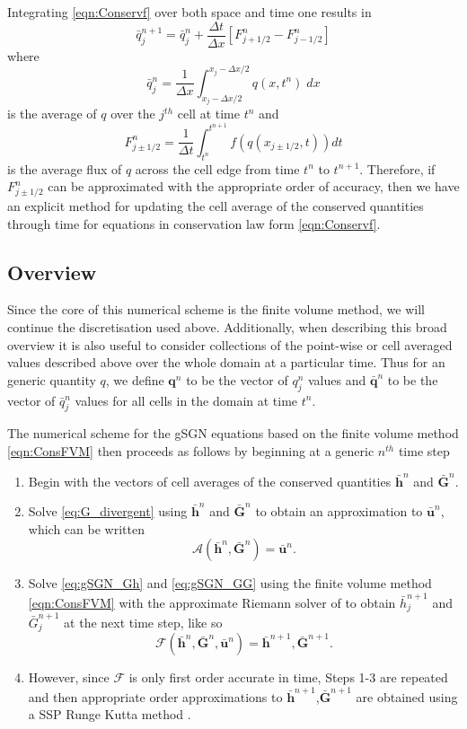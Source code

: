 \documentclass[10pt]{elsarticle}
\newcommand{\vecn}[1]{\boldsymbol{#1}}
\begin{document}
Integrating \eqref{eqn:Conservf} over both space and time one results in
\begin{equation}
\bar{q}^{n+1}_j = \bar{q}^{n}_j  +  \dfrac{\Delta t}{\Delta x}\left[F^n_{j+1/2} - F^n_{j-1/2}\right]
\label{eqn:ConsFVM}
\end{equation}
where 
\begin{equation*}
\bar{q}^n_j = \frac{1}{\Delta x} \int_{x_j - \Delta x / 2}^{x_j - \Delta x / 2} q(x,t^n) \; dx
\end{equation*}
is the average of $q$ over the $j^{th}$ cell at time $t^n$ and   
\begin{equation*}
F^n_{j\pm 1/2} =\frac{1}{\Delta t} \int_{t^n}^{t^{n+1}} f(q(x_{j\pm 1/2},t)) dt
\end{equation*}
is the average flux of $q$ across the cell edge from time $t^n$ to $t^{n+1}$. Therefore, if $F^n_{j\pm 1/2}$ can be approximated with the appropriate order of accuracy, then we have an explicit method for updating the cell average of the conserved quantities through time for equations in conservation law form \eqref{eqn:Conservf}. 


\subsection{Overview}
Since the core of this numerical scheme is the finite volume method, we will continue the discretisation used above. Additionally, when describing this broad overview it is also useful to consider collections of the point-wise or cell averaged values described above over the whole domain at a particular time. Thus for an generic quantity $q$, we define $\vecn{q}^n$ to be the vector of $q^n_j$ values and $\bar{\vecn{q}}^n$ to be the vector of $\bar{q}^n_j$ values for all cells in the domain at time $t^n$. 

The numerical scheme for the gSGN equations based on the finite volume method \eqref{eqn:ConsFVM} then proceeds as follows by beginning at a generic $n^{th}$ time step
\begin{enumerate}
	\item Begin with the vectors of cell averages of the conserved quantities $\bar{\vecn{h}}^n$ and $\bar{\vecn{G}}^n$.
	\item Solve \eqref{eq:G_divergent} using $\bar{\vecn{h}}^n$ and $\bar{\vecn{G}}^n$ to obtain an approximation to $\bar{{\vecn{u}}}^n$, which can be written
	\[\mathcal{A}\left(\bar{\vecn{h}}^n,\bar{\vecn{G}}^n\right) = \bar{{\vecn{u}}}^n.\]
	\item Solve \eqref{eq:gSGN_Gh} and \eqref{eq:gSGN_GG} using the finite volume method \eqref{eqn:ConsFVM} with the approximate Riemann solver of \citet{Kurganov-etal-2001-707} to obtain $\bar{h}^{n+1}_j$ and $\bar{G}^{n+1}_j$ at the next time step, like so
	\[\mathcal{F}\left(\bar{\vecn{h}}^n,\bar{\vecn{G}}^n,\bar{{\vecn{u}}}^n\right) = \bar{\vecn{h}}^{n+1 },\bar{\vecn{G}}^{n+1}.\]
	\item However, since $\mathcal{F}$ is only first order accurate in time, Steps 1-3 are repeated and then appropriate order approximations to $\bar{\vecn{h}}^{n+1 }$,$\bar{\vecn{G}}^{n+1}$ are obtained using a SSP Runge Kutta method \cite{Gottlieb-etal-2003-89}. 
\end{enumerate}
\end{document}
